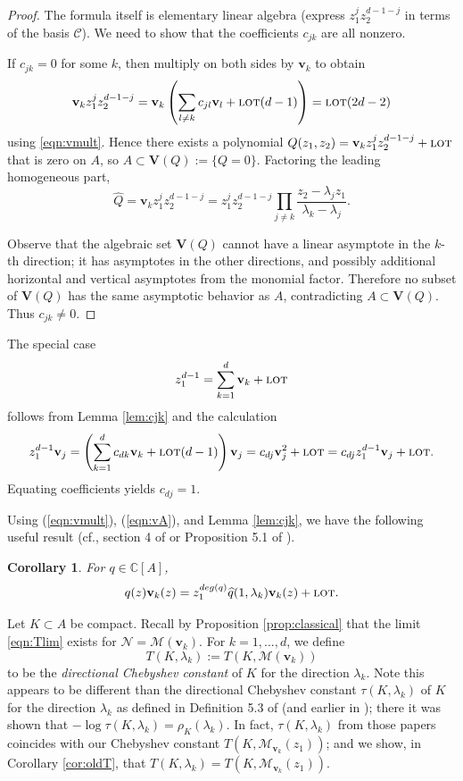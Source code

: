 \documentclass[12pt]{article}
\numberwithin{equation}{section}
\newtheorem{corollary}[theorem]{Corollary}
\newcommand{\C}{\mathbb{C}}
\renewcommand{\hat}{\widehat}
\newcommand{\calC}{\mathcal{C}}
\newcommand{\calM}{\mathcal{M}}
\newcommand{\lot}{\text{\sc lot}}
\newcommand{\calN}{\mathcal{N}}
\newcommand{\bV}{\mathbf{V}}
\newcommand{\bv}{\mathbf{v}}
\begin{document}
\begin{proof}
The formula itself is elementary linear algebra (express $z_1^jz_2^{d-1-j}$ in terms of the basis $\calC$).  We need to show that the coefficients $c_{jk}$ are all nonzero.

  If $c_{jk}=0$ for some $k$, then multiply on both sides by $\bv_k$ to obtain
\begin{equation}\label{eqn:vkdirection}
\bv_kz_1^jz_2^{d-1-j} = \bv_k\left(\sum_{l\neq k} c_{jl}\bv_l +\lot(d-1)\right) = \lot(2d-2)
\end{equation}
using \eqref{eqn:vmult}.    Hence there exists a polynomial  $Q(z_1,z_2)=\bv_kz_1^jz_2^{d-1-j}+\lot$ that is zero on $A$, so $A\subset\bV(Q):=\{Q=0\}$.  
Factoring the leading homogeneous part,  $$\hat Q=\bv_kz_1^jz_2^{d-1-j}=z_1^jz_2^{d-1-j} \prod_{j\neq k} \frac{z_2-\lambda_jz_1}{\lambda_k - \lambda_j}.$$ 

Observe that the algebraic set $\bV(Q)$ cannot have a linear asymptote in the $k$-th direction; it has asymptotes in the other directions, and possibly additional horizontal and vertical asymptotes from the monomial factor.   Therefore no subset of $\bV(Q)$ has the same asymptotic behavior as $A$, contradicting  $A\subset\bV(Q)$.  Thus $c_{jk}\neq 0$.  \end{proof}

The special case 
\begin{equation}\label{eqn:z1_cjk}
z_1^{d-1}=\sum_{k=1}^d\bv_k + \lot
\end{equation}
follows from Lemma \ref{lem:cjk} and the calculation 
$$
z_1^{d-1}\bv_j = \left(\sum_{k=1}^dc_{dk}\bv_k + \lot(d-1)\right)\bv_j = c_{dj}\bv_j^2 + \lot = c_{dj}z_1^{d-1}\bv_j + \lot.
$$
Equating coefficients yields $c_{dj}=1$.  

Using (\ref{eqn:vmult}), (\ref{eqn:vA}), and Lemma \ref{lem:cjk}, we have the following useful result (cf., section 4 of \cite{BM} or Proposition 5.1 of \cite{HM}).

\begin{corollary} \label{polyprop} For $q\in \C[A]$, 
$$q(z) \bv_k (z)= z_1^{deg(q)}\hat q(1,\lambda_k) \bv_k (z) + \lot.$$
\end{corollary} 


\bigskip

Let $K\subset A$ be compact.  Recall by Proposition \ref{prop:classical} that the limit \eqref{eqn:Tlim} exists for $\calN=\calM(\bv_k)$.  For $k=1,...,d$, we define
 \begin{equation} \label{dirchebc} T(K,\lambda_k):=T(K,\calM(\bv_k))\end{equation} 
 to be the \emph{directional Chebyshev constant} of $K$ for the direction $\lambda_k$. Note this appears to be different than the directional Chebyshev constant $\tau(K,\lambda_k)$ of $K$ for the direction $\lambda_k$ as defined in Definition 5.3 of \cite{HM} (and earlier in \cite{BM}); there it was shown that $-\log \tau(K,\lambda_k)=\rho_K(\lambda_k)$. In fact, $\tau(K,\lambda_k)$ from those papers coincides with our Chebyshev constant $T(K,\calM_{\bv_k}(z_1))$; and we show, in Corollary \ref{cor:oldT}, that $T(K,\lambda_k)=T(K,\calM_{\bv_k}(z_1))$. 
\end{document}
